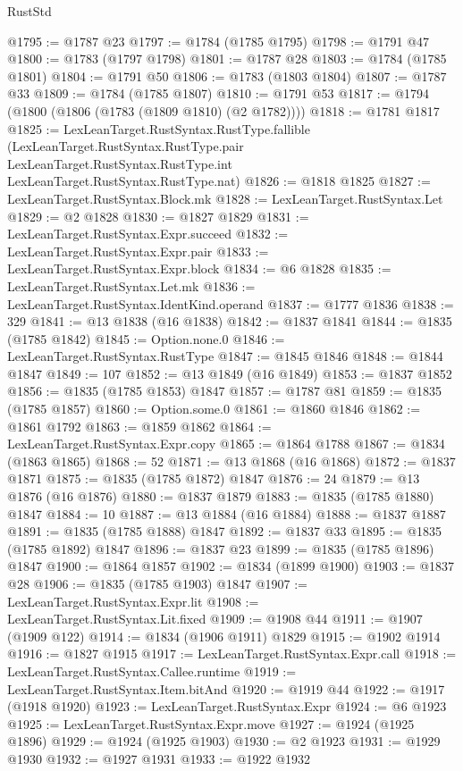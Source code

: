 \begin{lexlean}{RustStd}
\begin{coremodule}
{\begin{coremodule}
{{{{{@1795 := @1787 @23
@1797 := @1784 (@1785 @1795)
@1798 := @1791 @47
@1800 := @1783 (@1797 @1798)
@1801 := @1787 @28
@1803 := @1784 (@1785 @1801)
@1804 := @1791 @50
@1806 := @1783 (@1803 @1804)
@1807 := @1787 @33
@1809 := @1784 (@1785 @1807)
@1810 := @1791 @53
@1817 := @1794 (@1800 (@1806 (@1783 (@1809 @1810) (@2 @1782))))
@1818 := @1781 @1817
@1825 := LexLeanTarget.RustSyntax.RustType.fallible
    (LexLeanTarget.RustSyntax.RustType.pair
      LexLeanTarget.RustSyntax.RustType.int
      LexLeanTarget.RustSyntax.RustType.nat)
@1826 := @1818 @1825
@1827 := LexLeanTarget.RustSyntax.Block.mk
@1828 := LexLeanTarget.RustSyntax.Let
@1829 := @2 @1828
@1830 := @1827 @1829
@1831 := LexLeanTarget.RustSyntax.Expr.succeed
@1832 := LexLeanTarget.RustSyntax.Expr.pair
@1833 := LexLeanTarget.RustSyntax.Expr.block
@1834 := @6 @1828
@1835 := LexLeanTarget.RustSyntax.Let.mk
@1836 := LexLeanTarget.RustSyntax.IdentKind.operand
@1837 := @1777 @1836
@1838 := 329
@1841 := @13 @1838 (@16 @1838)
@1842 := @1837 @1841
@1844 := @1835 (@1785 @1842)
@1845 := Option.none.{0}
@1846 := LexLeanTarget.RustSyntax.RustType
@1847 := @1845 @1846
@1848 := @1844 @1847
@1849 := 107
@1852 := @13 @1849 (@16 @1849)
@1853 := @1837 @1852
@1856 := @1835 (@1785 @1853) @1847
@1857 := @1787 @81
@1859 := @1835 (@1785 @1857)
@1860 := Option.some.{0}
@1861 := @1860 @1846
@1862 := @1861 @1792
@1863 := @1859 @1862
@1864 := LexLeanTarget.RustSyntax.Expr.copy
@1865 := @1864 @1788
@1867 := @1834 (@1863 @1865)
@1868 := 52
@1871 := @13 @1868 (@16 @1868)
@1872 := @1837 @1871
@1875 := @1835 (@1785 @1872) @1847
@1876 := 24
@1879 := @13 @1876 (@16 @1876)
@1880 := @1837 @1879
@1883 := @1835 (@1785 @1880) @1847
@1884 := 10
@1887 := @13 @1884 (@16 @1884)
@1888 := @1837 @1887
@1891 := @1835 (@1785 @1888) @1847
@1892 := @1837 @33
@1895 := @1835 (@1785 @1892) @1847
@1896 := @1837 @23
@1899 := @1835 (@1785 @1896) @1847
@1900 := @1864 @1857
@1902 := @1834 (@1899 @1900)
@1903 := @1837 @28
@1906 := @1835 (@1785 @1903) @1847
@1907 := LexLeanTarget.RustSyntax.Expr.lit
@1908 := LexLeanTarget.RustSyntax.Lit.fixed
@1909 := @1908 @44
@1911 := @1907 (@1909 @122)
@1914 := @1834 (@1906 @1911) @1829
@1915 := @1902 @1914
@1916 := @1827 @1915
@1917 := LexLeanTarget.RustSyntax.Expr.call
@1918 := LexLeanTarget.RustSyntax.Callee.runtime
@1919 := LexLeanTarget.RustSyntax.Item.bitAnd
@1920 := @1919 @44
@1922 := @1917 (@1918 @1920)
@1923 := LexLeanTarget.RustSyntax.Expr
@1924 := @6 @1923
@1925 := LexLeanTarget.RustSyntax.Expr.move
@1927 := @1924 (@1925 @1896)
@1929 := @1924 (@1925 @1903)
@1930 := @2 @1923
@1931 := @1929 @1930
@1932 := @1927 @1931
@1933 := @1922 @1932
}}}}}
\end{coremodule}}
\end{coremodule}
\end{lexlean}
